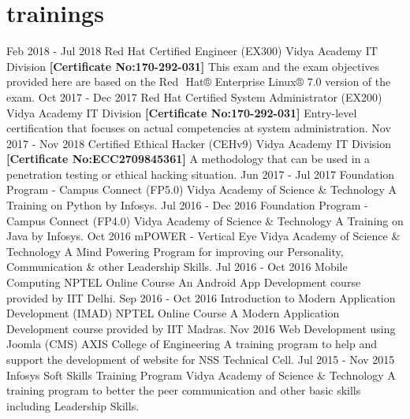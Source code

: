 \documentclass[]{friggeri-cv}
\begin{document}
\section{trainings}
\begin{entrylist}
	\entry
	{Feb 2018 - Jul 2018}
	{Red Hat Certified Engineer (EX300)}
	{Vidya Academy IT Division \newline \textbf{[Certificate No:170-292-031]}}
	{This exam and the exam objectives provided here are based on the Red  Hat® Enterprise Linux® 7.0 version of the exam.}
	\entry
	{Oct 2017 - Dec 2017}
	{Red Hat Certified System Administrator (EX200)}
	{Vidya Academy IT Division \newline \textbf{[Certificate No:170-292-031]}}
	{Entry-level certification that focuses on actual competencies at system administration.}
	\entry
	{Nov 2017 - Nov 2018}
	{Certified Ethical Hacker (CEHv9)}
	{Vidya Academy IT Division \newline \textbf{[Certificate No:ECC2709845361]}}
	{A methodology that can be used in a penetration testing or ethical hacking situation.}
	\entry
	{Jun 2017 - Jul 2017}
	{Foundation Program - Campus Connect (FP5.0)}
	{Vidya Academy of Science \& Technology}
	{A Training on Python by Infosys.}
	\entry
	{Jul 2016 - Dec 2016}
	{Foundation Program - Campus Connect (FP4.0)}
	{Vidya Academy of Science \& Technology}
	{A Training on Java by Infosys.}
	\entry
	{Oct 2016}
	{mPOWER - Vertical Eye}
	{Vidya Academy of Science \& Technology}
	{A Mind Powering Program for improving our Personality, Communication \& other Leadership Skills.}
    \entry
	{Jul 2016 - Oct 2016}
	{Mobile Computing}
	{NPTEL Online Course}
	{An Android App Development course provided by IIT Delhi.}
    \entry
	{Sep 2016 - Oct 2016}
	{Introduction to Modern Application Development (IMAD)}
	{NPTEL Online Course}
	{A Modern Application Development course provided by IIT Madras.}
    \entry
	{Nov 2016}
	{Web Development using Joomla (CMS)}
	{AXIS College of Engineering}
	{A training program to help and support the development of website for NSS Technical Cell.}
    \entry
	{Jul 2015 - Nov 2015}
	{Infosys Soft Skills Training Program}
	{Vidya Academy of Science \& Technology}
	{A training program to better the peer communication and other basic skills including Leadership Skills.}
\end{entrylist}
\end{document}
